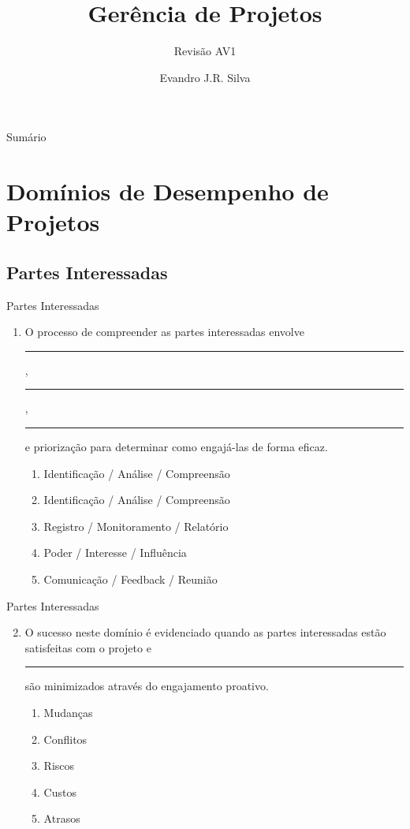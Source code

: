 \documentclass{beamer}
\title[GP 05]{Gerência de Projetos}
\subtitle{Revisão AV1}
\author[E.J.R. Silva]{Evandro J.R. Silva}
\date{}
\begin{document}
	
\begin{frame}
	\titlepage
\end{frame}

\begin{frame}{Sumário}
	\tableofcontents
\end{frame}

\section{Domínios de Desempenho de Projetos}

\subsection{Partes Interessadas}

\begin{frame}{Partes Interessadas}
	\begin{enumerate}
		\justifying
		\item O processo de compreender as partes interessadas envolve \rule{50pt}{1pt}, \rule{50pt}{1pt}, \rule{50pt}{1pt} e priorização para determinar como engajá-las de forma eficaz.
		\begin{enumerate}[a]
			\item Identificação / Análise / Compreensão
			\item \alert<2>{Identificação / Análise / Compreensão}
			\item Registro / Monitoramento / Relatório
			\item Poder / Interesse / Influência
			\item Comunicação / Feedback / Reunião
		\end{enumerate}
	\end{enumerate}
\end{frame}

\begin{frame}{Partes Interessadas}
	\begin{enumerate}
		\setcounter{enumi}{1}
		\justifying
		\item O sucesso neste domínio é evidenciado quando as partes interessadas estão satisfeitas com o projeto e \rule{60pt}{1pt} são minimizados através do engajamento proativo.
		\begin{enumerate}[a]
			\item Mudanças
			\item \alert<2>{Conflitos}
			\item Riscos
			\item Custos
			\item Atrasos
		\end{enumerate}
	\end{enumerate}
\end{frame}
\end{document}
